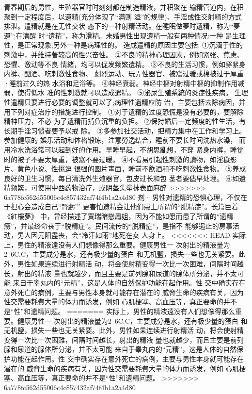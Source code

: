 \documentclass[12pt,UTF8]{ctexbook}
\begin{document}
青春期后的男性，生殖器官时时刻刻都在制造精液，并积聚在
输精管道内，在积聚到一定程度后，以遺精(充分体现了“满则
溢”的规律)、手淫或性交射精的方式排泄。遣精就是在无性交状
态下的一种射精活动。在睡眠做夢时遺精，称为“夢遺”;在清醒
时“遺精”，称为滑精。未婚男性出现遺精一般有两种情况:一种
是生理性，是正常现象;另外一种是病理性的。
造成遣精的原因主要包括:
①沉湎于性的刺激中，并维持著较高的性兴奋性。
②不良的精神心理因素，例如紧张、焦慮、恐懼、激动等不良
情緒，均可以促发频繁遺精。
③不良的生活习惯，例如穿紧身内裤、酗酒、吃刺激性食物、
劇烈运动、玩弄性器官、被窩过暖或棉被过于厚重·睡前过久的热
水浴和足浴等。
④神经衰弱。神经中樞对射精中樞的抑制作用减弱，使得低水
准的性刺激就可以造成遣精。
⑤泌尿生殖系統的炎症性疾病。
生理性遣精只要进行必要的调整就可以了;病理性遺精应防
治，主要包括去除病因，并用下列对症治疗的措施进行控制。
①对于遺精的过度恐慌是没有必要的，要解除精神压力，不必
为了遺精而掯負沉重的负担。
②保持婚后一定频度的性生活，有长期手淫习惯者要予以戒
除。
③多参加社交活动，把精力集中在工作和学习上。参加健康的
娛乐活动和体格锻炼，注意勞逸结合，睡前不要长时间洗热水澡，
而用冷水洗浴常可以起到好的作用。早睡早起，不胡思亂想，不穿
紧身内裤，睡觉时的被子不要太厚重，被窩不要过暖。
④不看易引起性刺激的讀物，如淫穢影片、黄色小说、性挑逗
很强的圆片畫面，睡前不飲酒和不吃刺激性食物。
⑤养成良好的卫生习惯，每日清洗外生殖器官，包皮过长和包
茎者要儘早处理。
⑥如遺精频繁，可使用中西药物治疗，或阴茎头塗抹表面麻醉
>>>>>>> 6a778fc562d55006c4c857432af74f4b1a2a4d80
剂·
男性对遗精的恐惧心理，不仅在于担心会造成自己“腎虧”’
更害怕遗精会让他们患上所谓的“脱精症”。长篇巨着《紅樓夢》
中，曾经描述了賈瑞暗戀鳳姐，因为不能如愿而患了所谓的“遗精
癆”，并最终命丧于“脱精症”。民间流传的“脱精症”，是指不
能够遏止的房事活动，男人因元阳盡丧，会“冷汗如雨”地死在女
人身上。
<<<<<<< HEAD
实际上，男性的精液遠没有人们想像得那么重要。健康男性一
次射出的精液量为2~6C.C，主要成分是水，还有极少量的蛋白
和无机鹽，损失一些也无关紧要。此外，男性如果连续进行射精活
动，将会使射精变得一次比一次困难，间隔时间越长，射出的精液
量也就越少，而且主要是前列腺和尿道的腺体所分泌，并不太可能
来自于睾丸内的“元精”，这是人体的自然保护功能在起作用。性
交中确实存在意外死亡的病例，主要与男性本身就可能存在潜在的
威脅生命的疾病有关，因为性交需要耗費大量的体力而诱发，例如
心肌梗塞、高血压等，真正要命的并不是“性”和遗精问题。
=======
实际上，男性的精液遠没有人们想像得那么重要。健康男性一
次射出的精液量为2~6C.C，主要成分是水，还有极少量的蛋白
和无机鹽，损失一些也无关紧要。此外，男性如果连续进行射精活
动，将会使射精变得一次比一次困難，间隔时间越长，射出的精液
量也就越少，而且主要是前列腺和尿道的腺体所分泌，并不太可能
来自于睾丸内的“元精”，这是人体的自然保护功能在起作用。性
交中确实存在意外死亡的病例，主要与男性本身就可能存在潜在的
威脅生命的疾病有关，因为性交需要耗費大量的体力而诱发，例如
心肌梗塞、高血压等，真正要命的并不是“性”和遺精问題。
>>>>>>> 6a778fc562d55006c4c857432af74f4b1a2a4d80
\end{document}
